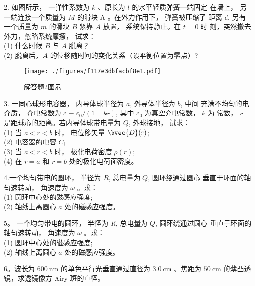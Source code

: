 2. 如图所示， 一弹性系数为 $k$ 、原长为 $l$ 的水平轻质弹簧一端固定 在墙上， 另一端连接一个质量为 $M$ 的滑块 $\mathrm{A}$ 。在外力作用下， 弹簧被压缩了 距离 $d$, 另有一个质量为 $m$ 的滑块 $B$ 紧靠 $A$ 放置， 系统保持静止。在 $t=0$ 时 刻，突然撤去外力，忽略系统摩擦， 试求：\\
(1) 什么时候 $B$ 与 $A$ 脱离？\\
(2) 脱离后，$A$ 的位移随时间的变化关系（设平衡位置为零点）?
\begin{figure}[ht]
\centering
\texttt{[image: ./figures/f117e3dbfacbf8e1.pdf]}
\caption{解答题2图示} \label{fig_CAS12_3}
\end{figure}
3. 一同心球形电容器， 内导体球半径为 $a$, 外导体半径为 $b$, 中间 充满不均匀的电介质， 介电常数为 $\varepsilon=\varepsilon_{0} /(1+k r)$, 其中 $\varepsilon_{0}$ 为真空介电常数， $k$ 为 常数， $r$ 是距球心的距离。若内导体球带电量为 $Q$, 外球接地， 试求：\\
(1) 当 $a<r< b$ 时， 电位移矢量 $\bvec{D}(r)$; \\
(2) 电容器的电容 $C$; \\
(3) 当 $a<r< b$ 时， 极化电荷密度 $\rho(r)$; \\
(4) 在 $r=a$ 和 $r=b$ 处的极化电荷面密度。

4.一个均匀带电的圆环， 半径为 $R$, 总电量为 $Q$, 圆环绕通过圆心
垂直于环面的轴匀速转动， 角速度为 $\omega$ 。求：\\
(1) 圆环中心处的磁感应强度;\\
(2) 轴线上离圆心 $a$ 处的磁感应强度。

5。 一个均匀带电的圆环， 半径为 $R$, 总电量为 $Q$, 圆环绕通过圆心 垂直于环面的轴匀速转动， 角速度为 $\omega$ 。求：\\
(1) 圆环中心处的磁感应强度;\\
(2) 轴线上离圆心 $a$ 处的磁感应强度。

6。波长为 $600 \mathrm{~nm}$ 的单色平行光垂直通过直径为 $3.0 \mathrm{~cm}$ 、焦距为 $50 \mathrm{~cm}$ 的薄凸透镜，求透镜像方 Airy 斑的直径。
